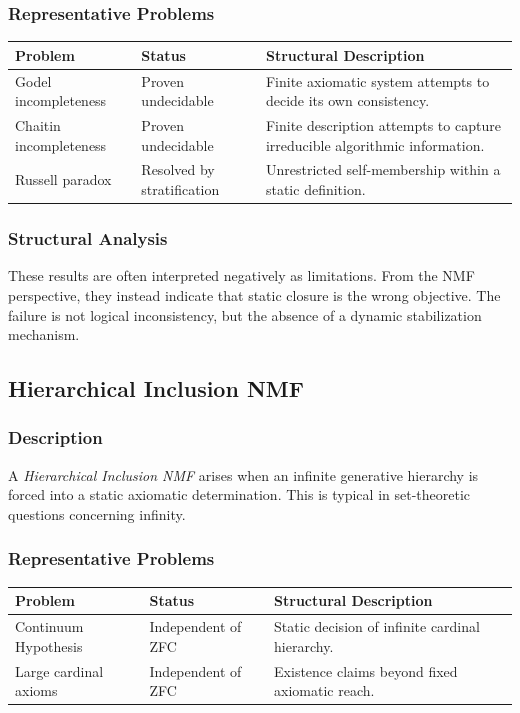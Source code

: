 \documentclass[11pt]{article}
\begin{document}
\subsubsection{Representative Problems}

\begin{center}
\begin{tabular}{|l|l|p{7cm}|}
\hline
Problem & Status & Structural Description \\
\hline
Godel incompleteness & Proven undecidable &
Finite axiomatic system attempts to decide its own
consistency. \\
\hline
Chaitin incompleteness & Proven undecidable &
Finite description attempts to capture irreducible
algorithmic information. \\
\hline
Russell paradox & Resolved by stratification &
Unrestricted self-membership within a static definition. \\
\hline
\end{tabular}
\end{center}

\subsubsection{Structural Analysis}

These results are often interpreted negatively as limitations.
From the NMF perspective, they instead indicate that static closure
is the wrong objective.
The failure is not logical inconsistency, but the absence of a
dynamic stabilization mechanism.

\subsection{Hierarchical Inclusion NMF}

\subsubsection{Description}

A \emph{Hierarchical Inclusion NMF} arises when an infinite generative
hierarchy is forced into a static axiomatic determination.
This is typical in set-theoretic questions concerning infinity.

\subsubsection{Representative Problems}

\begin{center}
\begin{tabular}{|l|l|p{7cm}|}
\hline
Problem & Status & Structural Description \\
\hline
Continuum Hypothesis & Independent of ZFC &
Static decision of infinite cardinal hierarchy. \\
\hline
Large cardinal axioms & Independent of ZFC &
Existence claims beyond fixed axiomatic reach. \\
\hline
\end{tabular}
\end{center}
\end{document}
